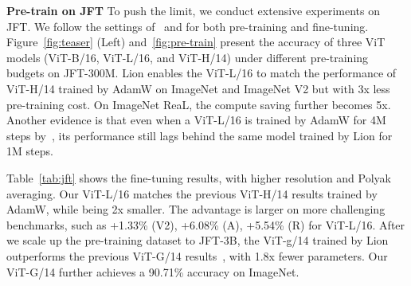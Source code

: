 \documentclass{article}
\newcommand{\name}{Lion}
\begin{document}
\textbf{Pre-train on JFT}
To push the limit, we conduct extensive experiments on JFT.
We follow the settings of~\citet{dosovitskiy2021vit} and \citet{zhai2021scalevit} for both pre-training and fine-tuning.
Figure~\ref{fig:teaser} (Left) and~\ref{fig:pre-train} present the accuracy of three ViT models (ViT-B/16, ViT-L/16, and ViT-H/14) under different pre-training budgets on JFT-300M.
\name{} enables the ViT-L/16 to match the performance of ViT-H/14 trained by AdamW on ImageNet and ImageNet V2 but with 3x less pre-training cost.
On ImageNet ReaL, the compute saving further becomes 5x.
Another evidence is that even when a ViT-L/16 is trained by AdamW for 4M steps by~\citet{zhai2021scalevit}, its performance still lags behind the same model trained by \name{} for 1M steps.


Table~\ref{tab:jft} shows the fine-tuning results, with higher resolution and Polyak averaging.
Our ViT-L/16 matches the previous ViT-H/14 results trained by AdamW, while being 2x smaller.
The advantage is larger on more challenging benchmarks, such as +1.33\% (V2), +6.08\% (A), +5.54\% (R) for ViT-L/16. After we scale up the pre-training dataset to JFT-3B, the ViT-g/14 trained by \name{} outperforms the previous ViT-G/14 results~\citep{zhai2021scalevit}, with 1.8x fewer parameters.
Our ViT-G/14 further achieves a 90.71\% accuracy on ImageNet.


\end{document}
